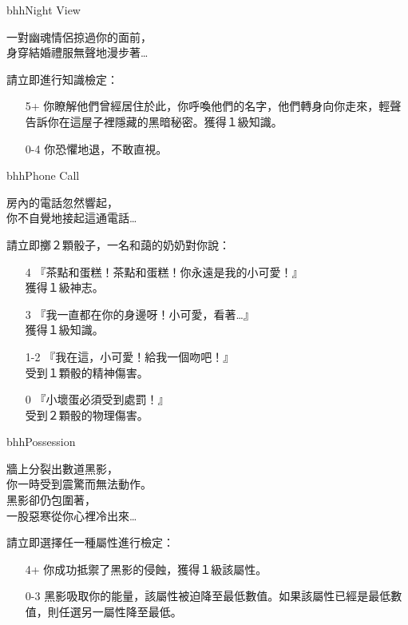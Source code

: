 \linebreak[0]%
\begin{EventCard}{bhh}{Night View}
	\begin{CardStory}
		一對幽魂情侶掠過你的面前，\\
		身穿結婚禮服無聲地漫步著…
	\end{CardStory}
	請立即進行知識檢定：
	\begin{itemize}
		\item[5+] 你瞭解他們曾經居住於此，你呼喚他們的名字，他們轉身向你走來，輕聲告訴你在這屋子裡隱藏的黑暗秘密。獲得１級知識。
		\item[0-4] 你恐懼地退，不敢直視。
	\end{itemize}
\end{EventCard}%
\linebreak[0]%
\begin{EventCard}{bhh}{Phone Call}
	\begin{CardStory}
		房內的電話忽然響起，\\
		你不自覺地接起這通電話…
	\end{CardStory}
	請立即擲２顆骰子，一名和藹的奶奶對你說：
	\begin{itemize}
		\item[4] 『茶點和蛋糕！茶點和蛋糕！你永遠是我的小可愛！』\\
		      獲得１級神志。
		\item[3] 『我一直都在你的身邊呀！小可愛，看著…』\\
		      獲得１級知識。
		\item[1-2] 『我在這，小可愛！給我一個吻吧！』\\
		      受到１顆骰的精神傷害。
		\item[0] 『小壞蛋必須受到處罰！』\\
		      受到２顆骰的物理傷害。
	\end{itemize}
\end{EventCard}%
\linebreak[0]%
\begin{EventCard}{bhh}{Possession}
	\begin{CardStory}
		牆上分裂出數道黑影，\\
		你一時受到震驚而無法動作。\\
		黑影卻仍包圍著，\\
		一股惡寒從你心裡冷出來…
	\end{CardStory}
	請立即選擇任一種屬性進行檢定：
	\begin{itemize}
		\item[4+] 你成功抵禦了黑影的侵蝕，獲得１級該屬性。
		\item[0-3] 黑影吸取你的能量，該屬性被迫降至最低數值。如果該屬性已經是最低數值，則任選另一屬性降至最低。
	\end{itemize}
\end{EventCard}%

